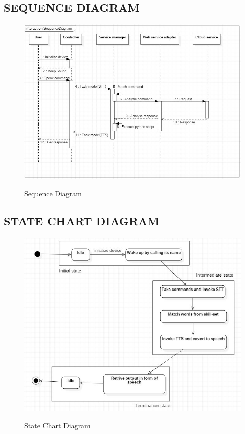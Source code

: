 \documentclass[12pt]{extreport}
\begin{document}
    \subsection{SEQUENCE DIAGRAM}
    \begin{figure}[H]
  \centering
  \includegraphics[scale=0.65]{Sequence.JPG}\\
  \caption{Sequence Diagram}
\end{figure}
 \pagebreak   
 
    \subsection{STATE CHART DIAGRAM}
    \begin{figure}[H]
  \centering
  \includegraphics[scale=0.7]{StateChart.JPG}\\
  \caption{State Chart Diagram}
\end{figure}
\pagebreak
\end{document}
